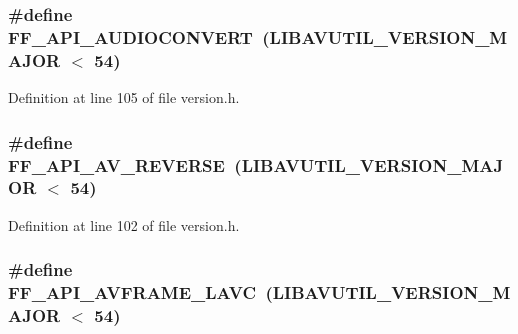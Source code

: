 \subsubsection[{\texorpdfstring{F\+F\+\_\+\+A\+P\+I\+\_\+\+A\+U\+D\+I\+O\+C\+O\+N\+V\+E\+RT}{FF_API_AUDIOCONVERT}}]{\setlength{\rightskip}{0pt plus 5cm}\#define F\+F\+\_\+\+A\+P\+I\+\_\+\+A\+U\+D\+I\+O\+C\+O\+N\+V\+E\+RT~({\bf L\+I\+B\+A\+V\+U\+T\+I\+L\+\_\+\+V\+E\+R\+S\+I\+O\+N\+\_\+\+M\+A\+J\+OR} $<$ 54)}\hypertarget{group__depr__guards_ga3a0080aa1ffefa42210b4cd9f14230df}{}\label{group__depr__guards_ga3a0080aa1ffefa42210b4cd9f14230df}


Definition at line 105 of file version.\+h.

\subsubsection[{\texorpdfstring{F\+F\+\_\+\+A\+P\+I\+\_\+\+A\+V\+\_\+\+R\+E\+V\+E\+R\+SE}{FF_API_AV_REVERSE}}]{\setlength{\rightskip}{0pt plus 5cm}\#define F\+F\+\_\+\+A\+P\+I\+\_\+\+A\+V\+\_\+\+R\+E\+V\+E\+R\+SE~({\bf L\+I\+B\+A\+V\+U\+T\+I\+L\+\_\+\+V\+E\+R\+S\+I\+O\+N\+\_\+\+M\+A\+J\+OR} $<$ 54)}\hypertarget{group__depr__guards_gab0b09a8ae1d3d054eddb618e6547e1ba}{}\label{group__depr__guards_gab0b09a8ae1d3d054eddb618e6547e1ba}


Definition at line 102 of file version.\+h.

\subsubsection[{\texorpdfstring{F\+F\+\_\+\+A\+P\+I\+\_\+\+A\+V\+F\+R\+A\+M\+E\+\_\+\+L\+A\+VC}{FF_API_AVFRAME_LAVC}}]{\setlength{\rightskip}{0pt plus 5cm}\#define F\+F\+\_\+\+A\+P\+I\+\_\+\+A\+V\+F\+R\+A\+M\+E\+\_\+\+L\+A\+VC~({\bf L\+I\+B\+A\+V\+U\+T\+I\+L\+\_\+\+V\+E\+R\+S\+I\+O\+N\+\_\+\+M\+A\+J\+OR} $<$ 54)}\hypertarget{group__depr__guards_ga67e9304f7c19df7a55773155fbbb91b3}{}\label{group__depr__guards_ga67e9304f7c19df7a55773155fbbb91b3}


